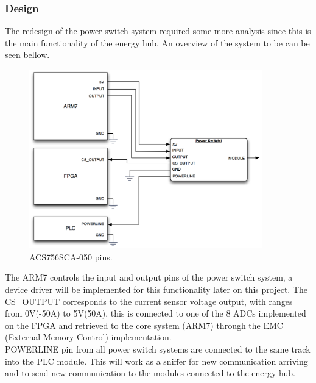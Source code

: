 \subsubsection{Design}
%
%
%
The redesign of the power switch system required some more analysis since this is the main functionality of the energy hub. 
An overview of the system to be can be seen bellow.
%
\begin{figure}[H]
	\begin{centering}
		\includegraphics[width=0.90\textwidth]{images/PS_BlockDiagram.png}
		\caption{ACS756SCA-050 pins.}
	\end{centering}
\end{figure}
%
The ARM7 controls the input and output pins of the power switch system, a device driver will be implemented for this functionality later on this project. 
The CS\_OUTPUT corresponds to the current sensor voltage output, with ranges from 0V(-50A) to 5V(50A), this is connected to one of the 8 ADCs implemented on the FPGA and retrieved to the core system (ARM7) through the EMC (External Memory Control) implementation.\\
POWERLINE pin from all power switch systems are connected to the same track into the PLC module. This will work as a sniffer for new communication arriving and to send new communication to the modules connected to the energy hub.\\

